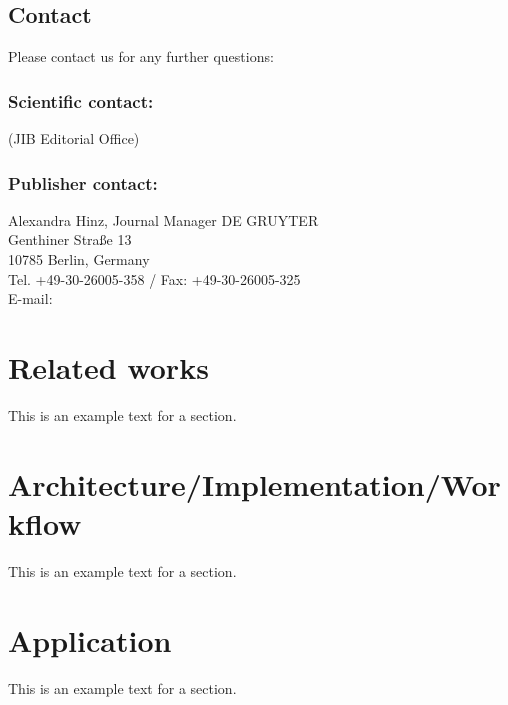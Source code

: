 \documentclass{jib}
\begin{document}
\subsection{Contact}

Please contact us for any further questions:

\subsubsection{Scientific contact:}

(JIB Editorial Office)

\subsubsection{Publisher contact:}

Alexandra Hinz, Journal Manager DE GRUYTER
\\
Genthiner Straße 13
\\
10785 Berlin, Germany
\\
Tel. +49-30-26005-358 / Fax: +49-30-26005-325
\\ 
E-mail:


%
%
\section{Related works}

This is an example text for a section.

%
%
\section{Architecture/Implementation/Workflow}

This is an example text for a section.

%
%
\section{Application}

This is an example text for a section.
\end{document}
